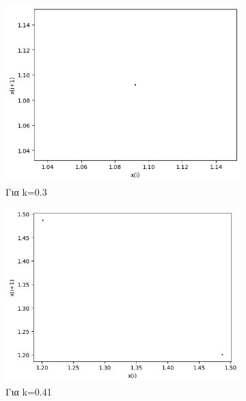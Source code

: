 \begin{figure}[h!]
	\centering	
	\begin{subfigure}[b]{0.4\linewidth}
		\centering
		\includegraphics[width=\linewidth]{LateX images/graphs/k03}
		\caption{Για k=0.3}
		\label{f:k1}
	\end{subfigure}
	\hfill
	\begin{subfigure}[b]{0.4\textwidth}
		\centering
		\includegraphics[width=\textwidth]{LateX images/graphs/k041}
		\caption{Για k=0.41}
		\label{f:k2}
	\end{subfigure}
	\hfill
	\begin{subfigure}[b]{0.4\textwidth}
		\centering

\end{subfigure}
\end{figure}
